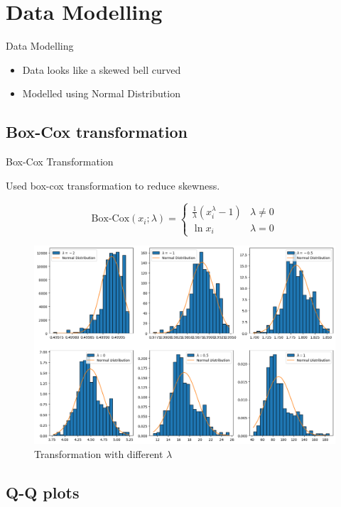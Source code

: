 \section{Data Modelling}

\begin{frame}{Data Modelling}
\begin{itemize}
    \item Data looks like a skewed bell curved
    \item Modelled using Normal Distribution
\end{itemize}
  
\end{frame}


\subsection{Box-Cox transformation}

\begin{frame}{Box-Cox Transformation}

Used box-cox transformation to reduce skewness.

\[
  \text{Box-Cox}(x_i; \lambda) =
  \begin{cases}
  \frac{1}{\lambda} (x_i ^ \lambda - 1) & \lambda \ne 0 \\
  \ln x_i & \lambda = 0
  \end{cases}
\]

\begin{figure}
  \centering
  \includegraphics[width=0.7\linewidth]{Project1/Report/images/transforms.png}
  \caption{Transformation with different $\lambda$}
\end{figure}
  
\end{frame}


\subsection{Q-Q plots}

